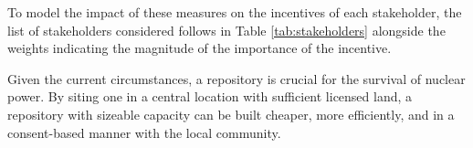 To model the impact of these measures on the incentives of each stakeholder, 
the list of stakeholders considered follows in Table \ref{tab:stakeholders} 
alongside the weights indicating the magnitude of the importance of the incentive.
 
\begin{table}[h]

\centering
\caption {Metrics and Weight for Each Stakeholder}
\label{tab:stakeholders}
\end{table}
Given the current circumstances, a repository is crucial for the survival of nuclear
power. By siting one in a central location with sufficient licensed land,
a repository with sizeable capacity can be built cheaper, more efficiently, and 
in a consent-based manner with the local community. 
